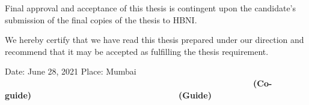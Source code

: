 Final approval and acceptance of this thesis is contingent upon the
candidate’s submission of the final copies of the thesis to HBNI.

We hereby certify that we have read this thesis prepared under our
direction and recommend that it may be accepted as fulfilling the
thesis requirement.

\vskip 30pt
{\rm Date: June 28, 2021}
\vskip 5pt
{\rm Place: Mumbai}
\vskip 30pt
~~~~~~~~~~~~~~~~~~~~~~~~~~~~~~~~~~~~~~~~~~~~~~~~~~~~~~~~~~~{\bf (Co-guide)}~~~~~~~~~~~~~~~~~~~~~~~~~~~~~~~~~~~{\bf (Guide)}


